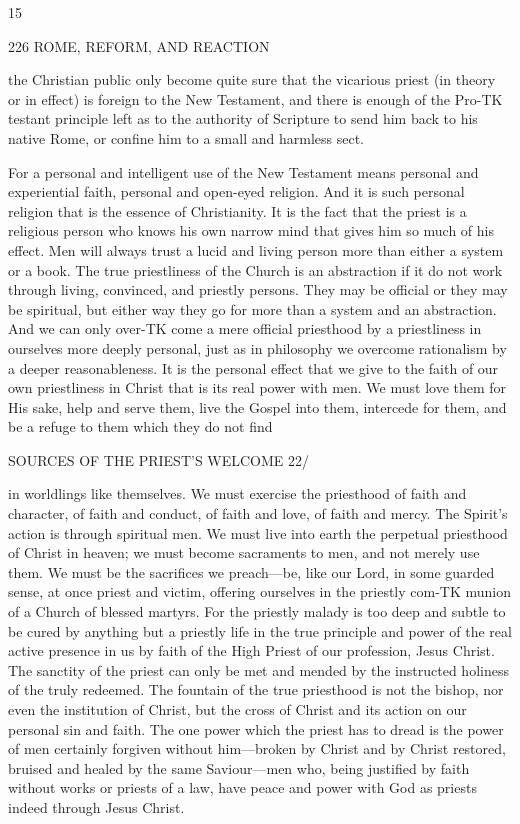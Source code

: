 \documentclass[12pt,a5paper,twoside]{book}
\begin{document}
{{15 



226 ROME, REFORM, AND REACTION 

the Christian public only become quite sure that the 
vicarious priest (in theory or in effect) is foreign to the 
New Testament, and there is enough of the Pro-TK
testant principle left as to the authority of Scripture 
to send him back to his native Rome, or confine him 
to a small and harmless sect. 

For a personal and intelligent use of the New 
Testament means personal and experiential faith, 
personal and open-eyed religion. And it is such 
personal religion that is the essence of Christianity. 
It is the fact that the priest is a religious person who 
knows his own narrow mind that gives him so much 
of his effect. Men will always trust a lucid and living 
person more than either a system or a book. The 
true priestliness of the Church is an abstraction if it 
do not work through living, convinced, and priestly 
persons. They may be official or they may be 
spiritual, but either way they go for more than a 
system and an abstraction. And we can only over-TK
come a mere official priesthood by a priestliness in 
ourselves more deeply personal, just as in philosophy 
we overcome rationalism by a deeper reasonableness. 
It is the personal effect that we give to the faith of our 
own priestliness in Christ that is its real power with 
men. We must love them for His sake, help and 
serve them, live the Gospel into them, intercede for 
them, and be a refuge to them which they do not find 



SOURCES OF THE PRIEST'S WELCOME 22/ 

in worldlings like themselves. We must exercise the 
priesthood of faith and character, of faith and conduct, 
of faith and love, of faith and mercy. The Spirit's 
action is through spiritual men. We must live into 
earth the perpetual priesthood of Christ in heaven; 
we must become sacraments to men, and not merely 
use them. We must be the sacrifices we preach---be, 
like our Lord, in some guarded sense, at once priest 
and victim, offering ourselves in the priestly com-TK
munion of a Church of blessed martyrs. For the 
priestly malady is too deep and subtle to be cured by 
anything but a priestly life in the true principle and 
power of the real active presence in us by faith of the 
High Priest of our profession, Jesus Christ. The 
sanctity of the priest can only be met and mended 
by the instructed holiness of the truly redeemed. 
The fountain of the true priesthood is not the bishop, 
nor even the institution of Christ, but the cross of 
Christ and its action on our personal sin and faith. 
The one power which the priest has to dread is the 
power of men certainly forgiven without him---broken 
by Christ and by Christ restored, bruised and healed 
by the same Saviour---men who, being justified by 
faith without works or priests of a law, have peace 
and power with God as priests indeed through Jesus 
Christ. 



}}
\end{document}
